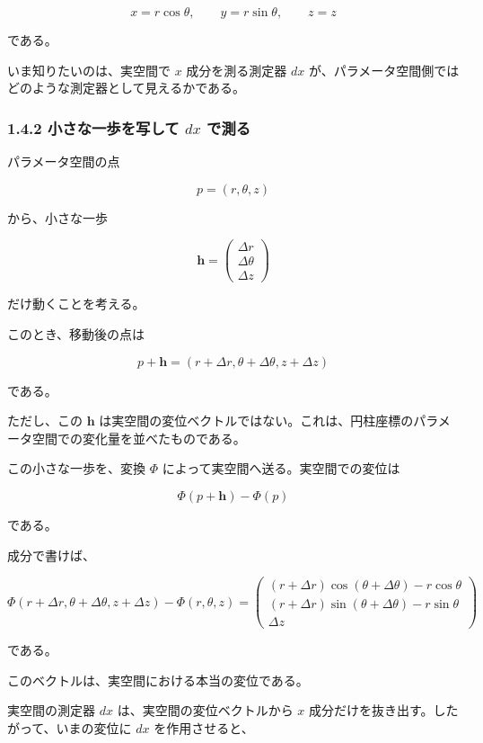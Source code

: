 \documentclass[a4paper,12pt,openany]{book}
\begin{document}
\[
x=r\cos\theta,\qquad
y=r\sin\theta,\qquad
z=z
\]

である。

いま知りたいのは、実空間で \(x\) 成分を測る測定器 \(dx\)
が、パラメータ空間側ではどのような測定器として見えるかである。

\hypertarget{ux5c0fux3055ux306aux4e00ux6b69ux3092ux5199ux3057ux3066-dx-ux3067ux6e2cux308b}{%
\subsubsection{\texorpdfstring{1.4.2 小さな一歩を写して \(dx\)
で測る}{1.4.2 小さな一歩を写して dx で測る}}\label{ux5c0fux3055ux306aux4e00ux6b69ux3092ux5199ux3057ux3066-dx-ux3067ux6e2cux308b}}

パラメータ空間の点

\[
p=(r,\theta,z)
\]

から、小さな一歩

\[
\mathbf{h}
=
\begin{pmatrix}
\Delta r\\
\Delta\theta\\
\Delta z
\end{pmatrix}
\]

だけ動くことを考える。

このとき、移動後の点は

\[
p+\mathbf{h}
=
(r+\Delta r,\theta+\Delta\theta,z+\Delta z)
\]

である。

ただし、この \(\mathbf h\)
は実空間の変位ベクトルではない。これは、円柱座標のパラメータ空間での変化量を並べたものである。

この小さな一歩を、変換 \(\Phi\) によって実空間へ送る。実空間での変位は

\[
\Phi(p+\mathbf h)-\Phi(p)
\]

である。

成分で書けば、

\[
\Phi(r+\Delta r,\theta+\Delta\theta,z+\Delta z)
-
\Phi(r,\theta,z)
=
\begin{pmatrix}
(r+\Delta r)\cos(\theta+\Delta\theta)-r\cos\theta\\
(r+\Delta r)\sin(\theta+\Delta\theta)-r\sin\theta\\
\Delta z
\end{pmatrix}
\]

である。

このベクトルは、実空間における本当の変位である。

実空間の測定器 \(dx\) は、実空間の変位ベクトルから \(x\)
成分だけを抜き出す。したがって、いまの変位に \(dx\) を作用させると、
\end{document}
